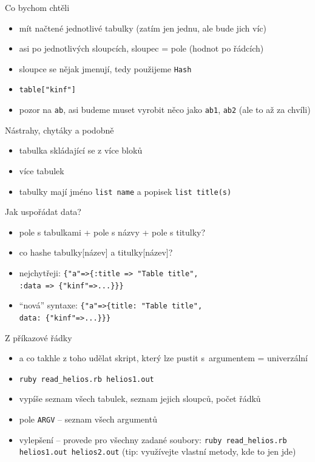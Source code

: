 \documentclass{beamer}
\begin{document}
\begin{frame}{Co bychom chtěli}
  \begin{itemize}
    \item mít načtené jednotlivé tabulky (zatím jen jednu, ale bude jich víc)
    \item asi po jednotlivých sloupcích, sloupec = pole (hodnot po řádcích)
    \item sloupce se nějak jmenují, tedy použijeme \texttt{Hash}
    \item \texttt{table["kinf"]}
    \item pozor na \texttt{ab}, asi budeme muset vyrobit něco jako \texttt{ab1}, \texttt{ab2} (ale to až za chvíli)
  \end{itemize}
\end{frame}

\begin{frame}{Nástrahy, chytáky a podobně}
  \begin{itemize}
    \item tabulka skládající se z více bloků
    \item více tabulek
    \item tabulky mají jméno \texttt{list name} a popisek \texttt{list title(s)}
  \end{itemize}
\end{frame}

\begin{frame}[fragile]{Jak uspořádat data?}
  \begin{itemize}
    \item pole s tabulkami + pole s názvy + pole s titulky?
    \pause
    \item co hashe tabulky[název] a titulky[název]?
    \pause
    \item nejchytřeji: \verb!{"a"=>{:title => "Table title",! \\ \verb!:data => {"kinf"=>...}}}!
    \pause
    \item ``nová'' syntaxe: \verb!{"a"=>{title: "Table title",! \\ \verb!data: {"kinf"=>...}}}!
  \end{itemize}
\end{frame}

\begin{frame}{Z příkazové řádky}
  \begin{itemize}
    \item a co takhle z toho udělat skript, který lze pustit s~argumentem = univerzální
    \item \texttt{ruby read\_helios.rb helios1.out}
    \item vypíše seznam všech tabulek, seznam jejich sloupců, počet řádků
    \item pole \texttt{ARGV} -- seznam všech argumentů
    \item vylepšení – provede pro všechny zadané soubory: \texttt{ruby read\_helios.rb helios1.out helios2.out} (tip: využívejte vlastní metody, kde to jen jde)
  \end{itemize}
\end{frame}
\end{document}
